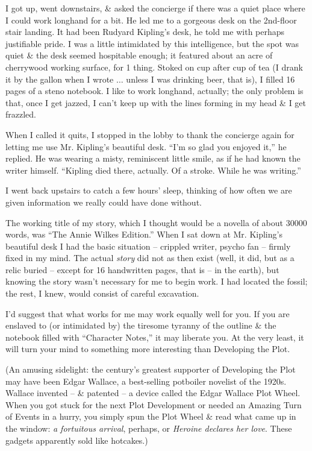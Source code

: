 \documentclass{article}
\numberwithin{equation}{section}
\begin{document}
I got up, went downstairs, \& asked the concierge if there was a quiet place where I could work longhand for a bit. He led me to a gorgeous desk on the 2nd-floor stair landing. It had been Rudyard Kipling's desk, he told me with perhaps justifiable pride. I was a little intimidated by this intelligence, but the spot was quiet \& the desk seemed hospitable enough; it featured about an acre of cherrywood working surface, for 1 thing. Stoked on cup after cup of tea (I drank it by the gallon when I wrote $\ldots$ unless I was drinking beer, that is), I filled 16 pages of a steno notebook. I like to work longhand, actually; the only problem is that, once I get jazzed, I can't keep up with the lines forming in my head \& I get frazzled.

When I called it quits, I stopped in the lobby to thank the concierge again for letting me use Mr. Kipling's beautiful desk. ``I'm so glad you enjoyed it,'' he replied. He was wearing a misty, reminiscent little smile, as if he had known the writer himself. ``Kipling died there, actually. Of a stroke. While he was writing.''

I went back upstairs to catch a few hours' sleep, thinking of how often we are given information we really could have done without.

The working title of my story, which I thought would be a novella of about 30000 words, was ``The Annie Wilkes Edition.'' When I sat down at Mr. Kipling's beautiful desk I had the basic situation -- crippled writer, psycho fan -- firmly fixed in my mind. The actual \textit{story} did not as then exist (well, it did, but as a relic buried -- except for 16 handwritten pages, that is -- in the earth), but knowing the story wasn't necessary for me to begin work. I had located the fossil; the rest, I knew, would consist of careful excavation.

I'd suggest that what works for me may work equally well for you. If you are enslaved to (or intimidated by) the tiresome tyranny of the outline \& the notebook filled with ``Character Notes,'' it may liberate you. At the very least, it will turn your mind to something more interesting than Developing the Plot.

(An amusing sidelight: the century's greatest supporter of Developing the Plot may have been Edgar Wallace, a best-selling potboiler novelist of the 1920s. Wallace invented -- \& patented -- a device called the Edgar Wallace Plot Wheel. When you got stuck for the next Plot Development or needed an Amazing Turn of Events in a hurry, you simply spun the Plot Wheel \& read what came up in the window: \textit{a fortuitous arrival}, perhaps, or \textit{Heroine declares her love}. These gadgets apparently sold like hotcakes.)
\end{document}
